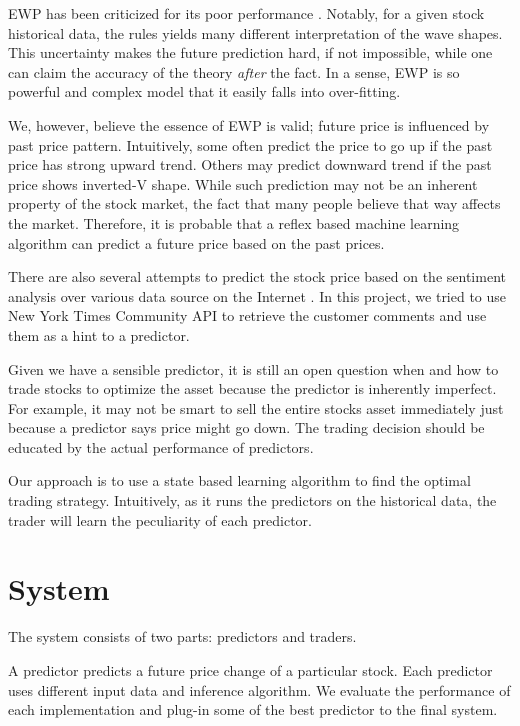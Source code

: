 \documentclass[twocolumn,10pt]{asme2ej}
\begin{document}
EWP has been criticized for its poor performance
\cite{aronson2007evidence-based}. Notably, for a given stock
historical data, the rules yields many different interpretation of the
wave shapes. This uncertainty makes the future prediction hard, if not
impossible, while one can claim the accuracy of the theory
\emph{after} the fact. In a sense, EWP is so powerful and complex
model that it easily falls into over-fitting.

We, however, believe the essence of EWP is valid; future price is influenced by
past price pattern. Intuitively, some often predict the price to go up if the
past price has strong upward trend. Others may predict downward trend if the
past price shows inverted-V shape. While such prediction may not be an inherent
property of the stock market, the fact that many people believe that way affects
the market. Therefore, it is probable that a reflex based machine learning
algorithm can predict a future price based on the past prices.

There are also several attempts to predict the stock price based on
the sentiment analysis over various data source on the Internet
\cite{arXiv:1010.3003}. In this project, we tried to use New York
Times Community API \cite{web:nytimes_community_api} to retrieve the
customer comments and use them as a hint to a predictor.

Given we have a sensible predictor, it is still an open question when and how to
trade stocks to optimize the asset because the predictor is inherently
imperfect. For example, it may not be smart to sell the entire stocks asset
immediately just because a predictor says price might go down. The trading
decision should be educated by the actual performance of predictors.

Our approach is to use a state based learning algorithm to find the
optimal trading strategy. Intuitively, as it runs the predictors on
the historical data, the trader will learn the peculiarity of each
predictor. 

\section{System}

The system consists of two parts: predictors and traders.

A predictor predicts a future price change of a particular
stock. Each predictor uses different input data and inference
algorithm. We evaluate the performance of each implementation and
plug-in some of the best predictor to the final system.
\end{document}
